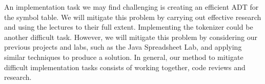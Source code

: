 \documentclass[10pt]{article}
\begin{document}
An implementation task we may find challenging is creating an efficient ADT for the symbol table. We will mitigate this problem by carrying out effective research and using the lectures to their full extent. Implementing the tokenizer could be another difficult task. However, we will mitigate this problem by considering our previous projects and labs, such as the Java Spreadsheet Lab, and applying similar techniques to produce a solution. In general, our method to mitigate difficult implementation tasks consists of working together, code reviews and research.
\end{document}
